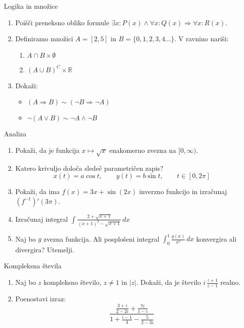 \begin{frame}{Logika in množice}
	\begin{enumerate}
		\item
		Poišči preneksno obliko formule $ \exists x: P(x) \wedge \forall x: Q(x) \Rightarrow \forall x: R(x)$.
		\item 
		Definiramo množici $ A=[2,5] $ in $ B=\{0,1,2,3,4\dots\}$.
		V ravnino nariši:
		\begin{enumerate}
		   \item $ A \cap B \times \emptyset $
		   \item $ (A \cup B)^{C} \times \mathbb{R} $
		\end{enumerate}
		\item
		Dokaži:
		\begin{itemize}
			\item $ (A \Rightarrow B) \sim (\neg B \Rightarrow \neg A)$
			\item $ \neg (A \vee B) \sim \neg A \wedge \neg B $
		\end{itemize}
	\end{enumerate}
\end{frame}

\begin{frame}{Analiza}
	\begin{enumerate}
		\item
		Pokaži, da je funkcija $ x \mapsto \sqrt{x} $ enakomerno zvezna na $ [0,\infty) $.
		\item 
		Katero krivuljo določa sledeč parametričen zapis?
		$$
		x(t) = a \cos t, \qquad %
		y(t) = b \sin t, \qquad %
		   t \in [0, 2 \pi]
		$$ 
		\item
		Pokaži, da ima $ f(x)=3x+\sin(2x) $ inverzno funkcijo in izračunaj $ (f^{-1})'(3\pi)$.
		
		\item
		Izračunaj integral 
		$ \displaystyle\int_{}^{} \frac{2+\sqrt{x+1}}{(x+1)^2-\sqrt{x+1}} \,dx $
		\item 
		Naj bo $g$ zvezna funkcija. Ali posplošeni integral 
		$ \int_{0}^{1} \frac{g(x)}{x^{2}} \, dx $
		konvergira ali divergira? Utemelji.
	\end{enumerate}
\end{frame}

\begin{frame}{Kompleksna števila}
	\begin{enumerate}
		\item
		Naj bo $z$ kompleksno število, $z \ne 1$ in $|z|$.
		Dokaži, da je število \( i \, \frac{z+1}{z-1} \) realno.
		\item
		Poenostavi izraz:
		$$ \frac{\displaystyle\frac{3+i}{2-2i}+\displaystyle\frac{7i}{1-i}}{1+\displaystyle\frac{i-1}{4}-\displaystyle\frac{5}{2-3i}} $$
	\end{enumerate}
\end{frame}